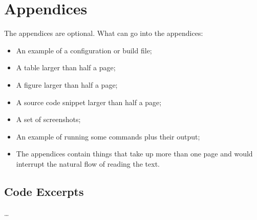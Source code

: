 \documentclass[12pt,a4paper]{report}
\begin{document}


\chapter*{Appendices}

The appendices are optional.
What can go into the appendices:
\begin{itemize}
\item	An example of a configuration or build file;
\item	A table larger than half a page;
\item	A figure larger than half a page;
\item	A source code snippet larger than half a page;
\item	A set of screenshots;
\item	An example of running some commands plus their output;
\item 	The appendices contain things that take up more than one page and would interrupt the natural flow of reading the text.
\end{itemize}

\begin{appendices}

\chapter{Code Excerpts} %
\ldots


\end{appendices}
\end{document}
